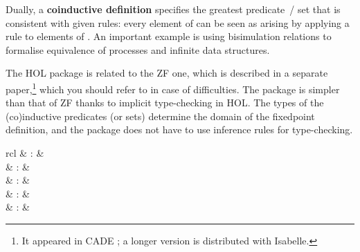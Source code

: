 \begin{isabellebody}
\begin{isamarkuptext}
  Dually, a \textbf{coinductive definition} specifies the greatest
  predicate~/ set  that is consistent with given rules: every
  element of  can be seen as arising by applying a rule to
  elements of .  An important example is using bisimulation
  relations to formalise equivalence of processes and infinite data
  structures.

  \medskip The HOL package is related to the ZF one, which is
  described in a separate paper,\footnote{It appeared in CADE
  \cite{paulson-CADE}; a longer version is distributed with Isabelle.}
  which you should refer to in case of difficulties.  The package is
  simpler than that of ZF thanks to implicit type-checking in HOL.
  The types of the (co)inductive predicates (or sets) determine the
  domain of the fixedpoint definition, and the package does not have
  to use inference rules for type-checking.

  \begin{matharray}{rcl}
    \hypertarget{command.HOL.inductive}{\hyperlink{command.HOL.inductive}{\mbox{}}} & : &  \\
    \hypertarget{command.HOL.inductive-set}{\hyperlink{command.HOL.inductive-set}{\mbox{}}} & : &  \\
    \hypertarget{command.HOL.coinductive}{\hyperlink{command.HOL.coinductive}{\mbox{}}} & : &  \\
    \hypertarget{command.HOL.coinductive-set}{\hyperlink{command.HOL.coinductive-set}{\mbox{}}} & : &  \\
    \hypertarget{attribute.HOL.mono}{\hyperlink{attribute.HOL.mono}{\mbox{}}} & : &  \\
  \end{matharray}


\end{isamarkuptext}
\end{isabellebody}
